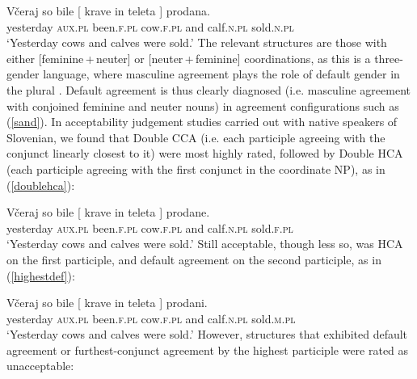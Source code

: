 \documentclass[output=paper
,modfonts
,nonflat]{langsci/langscibook}
\begin{document}
\ea \label{sand}
\gll Včeraj      so    bile       [ krave    in    teleta ]    prodana.\\
yesterday \textsc{aux.pl} been.\textsc{f.pl} {} cow.\textsc{f.pl} and calf.\textsc{n.pl} {}   sold.\textsc{n.pl} \\
\glt `Yesterday cows and calves were sold.' \citep{marusicnevinsbadecker:15}
\z
The relevant structures are those with either [feminine\,+\,neuter] or [neuter\,+\,fem\-inine] coordinations, as this is a three-gender language, where masculine agreement plays the role of default gender in the plural \citep{marusicnevinsbadecker:15,willergold:16}. Default agreement is thus clearly diagnosed (i.e. masculine agreement with conjoined feminine and neuter nouns) in agreement configurations such as (\ref{sand}). In acceptability judgement studies carried out with native speakers of Slovenian, we found that Double CCA (i.e. each participle agreeing with the conjunct linearly closest to it) were most highly rated, followed by Double HCA (each participle agreeing with the first conjunct in the coordinate NP), as in (\ref{doublehca}):

\ea \label{doublehca}
\gll Včeraj so bile  [ krave in teleta ] prodane.\\
yesterday \textsc{aux.pl} been.\textsc{f.pl} {} cow.\textsc{f.pl} and calf.\textsc{n.pl} {} sold.\textsc{f.pl} \\
\glt `Yesterday cows and calves were sold.' 
\z
Still acceptable, though less so, was HCA on the first participle, and default agreement on the second participle, as in (\ref{highestdef}):

\ea \label{highestdef}
\gll Včeraj      so    bile       [ krave    in    teleta ]    prodani.\\
yesterday \textsc{aux.pl} been.\textsc{f.pl} {} cow.\textsc{f.pl} and calf.\textsc{n.pl} {}   sold.\textsc{m.pl} \\
\glt `Yesterday cows and calves were sold.' 
\z
However, structures that exhibited default agreement or furthest-conjunct agreement by the highest participle were rated as unacceptable:
\end{document}
